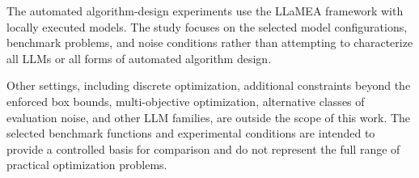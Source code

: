 The automated algorithm-design experiments use the LLaMEA framework with locally
executed models. The study focuses on the selected model configurations,
benchmark problems, and noise conditions rather than attempting to characterize
all LLMs or all forms of automated algorithm design.

Other settings, including discrete optimization, additional constraints
beyond the enforced box bounds, multi-objective optimization, alternative
classes of evaluation noise, and other LLM families, are outside the scope
of this work. The selected benchmark
functions and experimental conditions are intended to provide a controlled basis
for comparison and do not represent the full range of practical optimization
problems.







